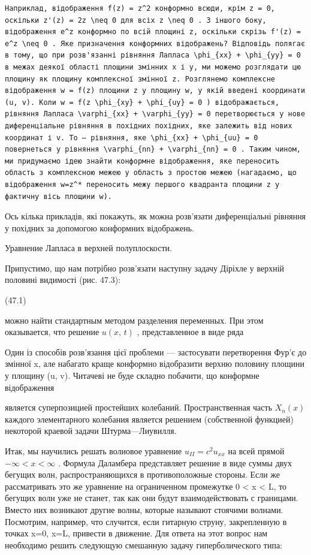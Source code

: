 \documentclass[
  ukrainian,
]{article}
\begin{document}
\begin{verbatim}
Наприклад, відображення f(z) = z^2 конформно всюди, крім z = 0, оскільки z'(z) = 2z \neq 0 для всіх z \neq 0 . З іншого боку, відображення e^z конформно по всій площині z, оскільки скрізь f'(z) = e^z \neq 0 . Яке призначення конформних відображень? Відповідь полягає в тому, що при розв'язанні рівняння Лапласа \phi_{xx} + \phi_{yy} = 0 в межах деякої області площини змінних x і y, ми можемо розглядати цю площину як площину комплексної змінної z. Розглянемо комплексне відображення w = f(z) площини z у площину w, у якій введені координати (u, v). Коли w = f(z \phi_{xy} + \phi_{uy} = 0 ) відображається, рівняння Лапласа \varphi_{xx} + \varphi_{yy} = 0 перетворюється у нове диференціальне рівняння в похідних похідних, яке залежить від нових координат і v. To — рівняння, яке \phi_{xx} + \phi_{uu} = 0 повернеться у рівняння \varphi_{nn} + \varphi_{nn} = 0 . Таким чином, ми придумаємо ідею знайти конформне відображення, яке переносить область з комплексною межею у область з простою межею (нагадаємо, що відображення w=z^* переносить межу першого квадранта площини z у фактичну вісь площини w).
\end{verbatim}

Ось кілька прикладів, які покажуть, як можна розв'язати диференціальні
рівняння у похідних за допомогою конформних відображень.

Уравнение Лапласа в верхней полуплоскости.

Припустимо, що нам потрібно розв'язати наступну задачу Діріхле у верхній
половині видимості (рис. 47.3):

(47.1)

можно найти стандартным методом разделения переменных. При этом
оказывается, что решение \(u\left(x,\,t\right)\) , представленное в виде
ряда

Один із способів розв'язання цієї проблеми --- застосувати перетворення
Фур'є до змінної x, але набагато краще конформно відобразити верхню
половину площини у площину (u, v). Читачеві не буде складно побачити, що
конформне відображення

является суперпозицией простейших колебаний. Пространственная часть
\(X_n(x)\) каждого элементарного колебания является решением
(собственной функцией) некоторой краевой задачи Штурма---Лиувилля.

Итак, мы научились решать волиовое уравнение \(u_{II}=c^2u_{xx}\) на
всей прямой \(-\infty < x < \infty\) . Формула Даламбера представляет
решение в виде суммы двух бегущих волн, распространяющихся в
противоположные стороны. Если же рассматривать это же уравнение на
ограниченном промежутке 0 \textless{} x \textless{} L, то бегущих волн
уже не станет, так как они будут взаимодействовать с границами. Вместо
них возникают другие волны, которые называют стоячими волнами.
Посмотрим, например, что случится, если гитарную струну, закрепленную в
точках x=0, x=L, привести в движение. Для ответа на этот вопрос нам
необходимо решить следующую смешанную задачу гиперболического типа:
\end{document}
